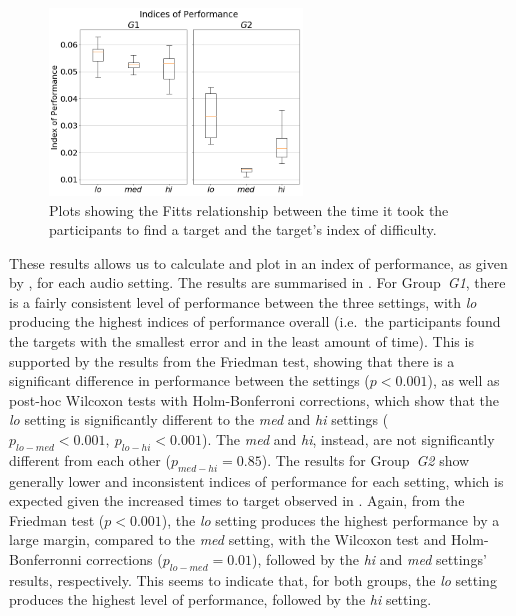 \documentclass[acmsmall]{acmart}
\begin{document}
\begin{figure}
  \centering
  \includegraphics[width=0.6\textwidth]{figures/fitts_ips.png}
  \caption{Plots showing the Fitts relationship between the time it took the participants to find a target and the target's index of difficulty. }\label{fig:fitts-ips}
\end{figure}

These results allows us to calculate and plot in  an index of performance, as given by , for each audio setting.
The results are summarised in .
For Group~\textit{G1}, there is a fairly consistent level of performance between the three settings, with \textit{lo} producing the highest indices of performance overall (i.e.\ the participants found the targets with the smallest error and in the least amount of time).
This is supported by the results from the Friedman test, showing that there is a significant difference in performance between the settings ($p < 0.001$), as well as post-hoc Wilcoxon tests with Holm-Bonferroni corrections, which show that the \textit{lo} setting is significantly different to the \textit{med} and \textit{hi} settings ($p_{lo-med} < 0.001,~p_{lo-hi} < 0.001$). The \textit{med} and \textit{hi}, instead, are not significantly different from each other ($p_{med-hi} = 0.85$).
The results for Group~\textit{G2} show generally lower and inconsistent indices of performance for each setting, which is expected given the increased times to target observed in .
Again, from the Friedman test ($p < 0.001$), the \textit{lo} setting produces the highest performance by a large margin, compared to the \textit{med} setting, with the Wilcoxon test and Holm-Bonferronni corrections ($p_{lo-med}=0.01$), followed by the \textit{hi} and \textit{med} settings' results, respectively.
This seems to indicate that, for both groups, the \textit{lo} setting produces the highest level of performance, followed by the \textit{hi} setting.
\end{document}
